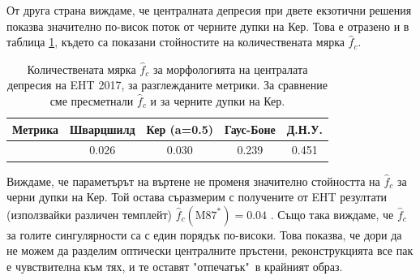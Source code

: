 От друга страна виждаме, че централната депресия при двете екзотични решения показва значително по-висок поток от черните дупки на Кер. Това е отразено и в таблица \ref{table:f_2017}, където са показани стойностите на количествената мярка $\hat{f}_c$.

\begin{table}[h!]
	\centering
	\begin{tabular}{||c|c|c|c|c||}
		\hline
		{Метрика} & {Шварцшилд}&{Кер (a=0.5)}&{Гаус-Боне}&{Д.Н.У.}
		\\\hline
		{\thead{$\hat{f}_c$}} & 0.026&0.030&0.239&0.451
		\\\hline
	\end{tabular}
	\caption[Количествената мярка $\hat{f}_c$ за морфологията на централата депресия на EHT 2017]{Количествената мярка $\hat{f}_c$ за морфологията на централата депресия на EHT 2017, за разглежданите метрики. За сравнение сме пресметнали $\hat{f}_c$ и за черните дупки на Кер.}
	\label{table:f_2017}
\end{table}

Виждаме, че параметърът на въртене не променя значително стойността на $\hat{f}_c$ за черни дупки на Кер. Той остава съразмерим с получените от EHT резултати (използвайки различен темплейт) $\hat{f}_c(\text{M}87^*) = 0.04$ \cite{EHT_M87_IV}. Също така виждаме, че $\hat{f}_c$ за голите сингулярности са с един порядък по-високи. Това показва, че дори да не можем да разделим оптически централните пръстени, реконструкцията все пак е чувствителна към тях, и те оставят "отпечатък"$\,$ в крайният образ.

\newpage

